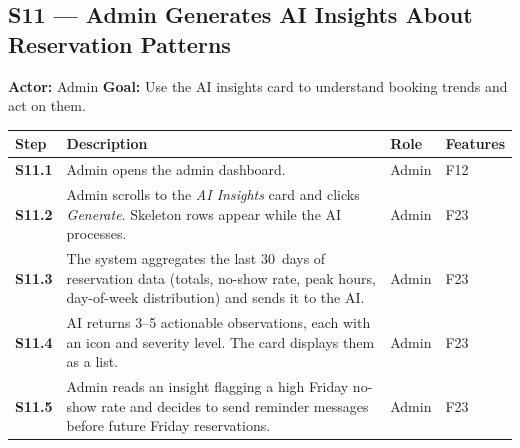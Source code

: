 \documentclass[12pt,a4paper]{article}
\begin{document}
\subsection*{S11 --- Admin Generates AI Insights About Reservation Patterns}
\begin{mdframed}[style=scenariobox]
\textbf{Actor:} Admin \quad
\textbf{Goal:} Use the AI insights card to understand booking trends and
act on them.
\end{mdframed}

\begin{longtable}{>{\bfseries}l L{6.5cm} l L{3cm}}
    \toprule
    Step & Description & Role & Features \\
    \midrule
    S11.1 & Admin opens the admin dashboard. & Admin & F12 \\
    S11.2 & Admin scrolls to the \emph{AI Insights} card and clicks
            \emph{Generate}. Skeleton rows appear while the AI processes. & Admin & F23 \\
    S11.3 & The system aggregates the last 30~days of reservation data
            (totals, no-show rate, peak hours, day-of-week distribution)
            and sends it to the AI. & Admin & F23 \\
    S11.4 & AI returns 3--5 actionable observations, each with an icon
            and severity level. The card displays them as a list. & Admin & F23 \\
    S11.5 & Admin reads an insight flagging a high Friday no-show rate
            and decides to send reminder messages before future Friday
            reservations. & Admin & F23 \\
    \bottomrule
\end{longtable}
\end{document}
